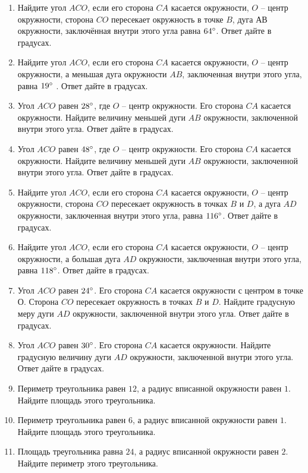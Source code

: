 \documentclass[12pt, a4paper]{article}
\begin{document}
\begin{enumerate}
		\item Найдите угол \( ACO \), если его сторона \( CA \) касается окружности, \( O \) – центр окружности, сторона \( CO \)  пересекает окружность в точке \( B \), дуга \( АВ \)  окружности, заключённая внутри этого угла равна \( 64\degree \). Ответ дайте в градусах.
		\item Найдите угол \( ACO \), если его сторона \( CA \) касается окружности, \( O \) – центр окружности, а меньшая дуга окружности \( AB\),  заключенная внутри этого угла, равна \( 19\degree \) . Ответ дайте в градусах.
		\item Угол \( ACO \) равен \( 28\degree \), где \( O \) – центр окружности. Его сторона \( CA \) касается окружности. Найдите величину меньшей дуги \( AB \) окружности, заключенной внутри этого угла. Ответ дайте в градусах.
		\item Угол \( ACO \) равен \( 48\degree \), где \( O \) – центр окружности. Его сторона \( CA \) касается окружности. Найдите величину меньшей дуги \( AB \) окружности, заключенной внутри этого угла. Ответ дайте в градусах.
		\item Найдите угол \( ACO \), если его сторона \( CA \) касается окружности, \( O \) – центр окружности, сторона \( CO \) пересекает окружность в точках \( B \) и \( D \), а дуга \( AD \) окружности, заключенная внутри этого угла, равна \( 116\degree \). Ответ дайте в градусах.
		\item Найдите угол \( ACO \), если его сторона \( CA \) касается окружности, \( O \) – центр окружности, а большая дуга \( AD \) окружности, заключенная внутри этого угла, равна \( 118 \degree\). Ответ дайте в градусах.
		\item Угол \( ACO \) равен \( 24\degree\). Его сторона \( CA \) касается окружности с центром в точке \( О \). Сторона \( CO \) пересекает окружность в точках \( B \) и \( D \). Найдите градусную меру дуги \( AD \) окружности, заключенной внутри этого угла. Ответ дайте в градусах.
		\item Угол \( ACO \) равен \( 30 \degree\). Его сторона \( CA \) касается окружности. Найдите градусную величину дуги \( AD \) окружности, заключенной внутри этого угла. Ответ дайте в градусах.
		\item Периметр треугольника равен \(12\), а радиус вписанной окружности равен \( 1 \). Найдите площадь этого треугольника.
		\item Периметр треугольника равен \( 6 \), а радиус вписанной окружности равен \( 1 \). Найдите площадь этого треугольника.
		\item Площадь треугольника равна \( 24 \), а радиус вписанной окружности равен \( 2 \). Найдите периметр этого треугольника.

\end{enumerate}
\end{document}
